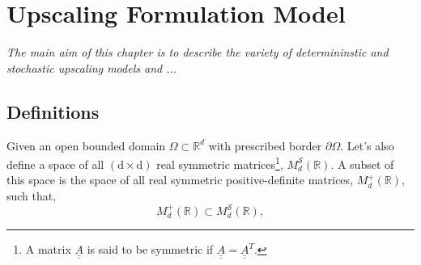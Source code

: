 
\chapter{Upscaling Formulation Model}\label{Chapter:UpscalingFormulationModel}

\begin{adjustwidth}{1cm}{1cm}
   {\it The main aim of this chapter is to describe the variety of determininstic and stochastic upscaling models and ...}
\medskip
\end{adjustwidth}


\section{Definitions}\label{Chapter:UpscalingFormulationModel:Section:Definitions}

Given an open bounded domain $\Omega\subset\mathbb{R}^{d}$ with prescribed border $\partial\Omega$. Let's also define a space of all $\left(\text{d}\times\text{d}\right)$ real symmetric matrices\footnote{A matrix $\underline{\underline{A}}$ is said to be symmetric if $\underline{\underline{A}} = \underline{\underline{A}}^{T}$.}, $M_{d}^{\mathcal{S}}\left(\mathbb{R}\right)$. A subset of this space is the space of all real symmetric positive-definite matrices, $M_{d}^{+}\left(\mathbb{R}\right)$, such that,
\begin{displaymath}
  M_{d}^{+}\left(\mathbb{R}\right) \subset M_{d}^{\mathcal{S}}\left(\mathbb{R}\right),
\end{displaymath}

